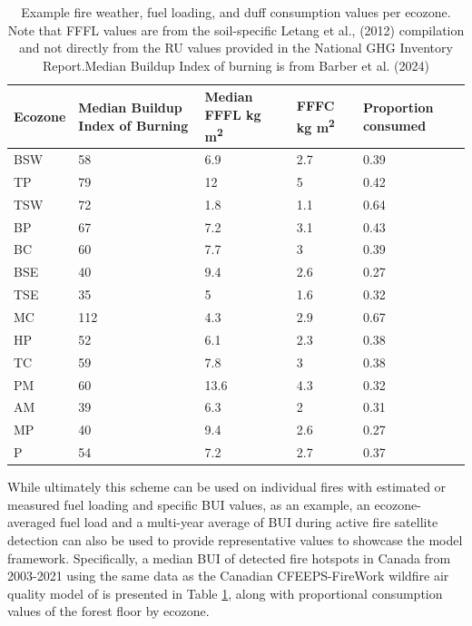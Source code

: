 \documentclass[, manuscript]{copernicus}
\begin{document}
\begin{table}
\centering\centering
\caption{\label{tab:tab-DuffConsumpTable}Example fire weather, fuel loading, and duff consumption values per ecozone. Note that FFFL values are from the soil-specific Letang et al., (2012) compilation and not directly from the RU values provided in the National GHG Inventory Report.Median Buildup Index of burning is from Barber et al. (2024)}
\centering
\begin{tabular}[t]{l|l|l|l|l}
\hline
Ecozone & Median Buildup Index of Burning & Median FFFL kg m\textsuperscript{2} & FFFC kg m\textsuperscript{2} & Proportion consumed\\
\hline
BSW & 58 & 6.9 & 2.7 & 0.39\\
\hline
TP & 79 & 12 & 5 & 0.42\\
\hline
TSW & 72 & 1.8 & 1.1 & 0.64\\
\hline
BP & 67 & 7.2 & 3.1 & 0.43\\
\hline
BC & 60 & 7.7 & 3 & 0.39\\
\hline
BSE & 40 & 9.4 & 2.6 & 0.27\\
\hline
TSE & 35 & 5 & 1.6 & 0.32\\
\hline
MC & 112 & 4.3 & 2.9 & 0.67\\
\hline
HP & 52 & 6.1 & 2.3 & 0.38\\
\hline
TC & 59 & 7.8 & 3 & 0.38\\
\hline
PM & 60 & 13.6 & 4.3 & 0.32\\
\hline
AM & 39 & 6.3 & 2 & 0.31\\
\hline
MP & 40 & 9.4 & 2.6 & 0.27\\
\hline
P & 54 & 7.2 & 2.7 & 0.37\\
\hline
\end{tabular}
\end{table}

While ultimately this scheme can be used on individual fires with
estimated or measured fuel loading and specific BUI values, as an
example, an ecozone-averaged fuel load and a multi-year average of BUI
during active fire satellite detection can also be used to provide
representative values to showcase the model framework. Specifically, a
median BUI of detected fire hotspots in Canada from 2003-2021
\citep{barber2024} using the same data as the Canadian CFEEPS-FireWork
wildfire air quality model of \citep{chen2019} is presented in Table
\ref{tab:tab-DuffConsumpTable}, along with proportional consumption
values of the forest floor by ecozone.
\end{document}
